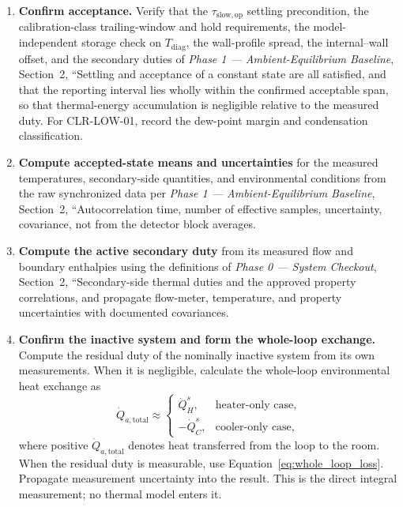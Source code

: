 \documentclass[11pt]{article}
\newcommand{\Tdiag}{T_{\mathrm{diag}}}
\newcommand{\QHs}{\dot Q_{H}^{s}}
\newcommand{\QCs}{\dot Q_{C}^{s}}
\newcommand{\PhaseZeroDoc}{\textit{Phase 0 --- System Checkout}}
\newcommand{\PhaseOneDoc}{\textit{Phase 1 --- Ambient-Equilibrium Baseline}}
\begin{document}
\begin{enumerate}
    \item \textbf{Confirm acceptance.} Verify that the $\tau_{\mathrm{slow,op}}$ settling precondition, the calibration-class trailing-window and hold requirements, the model-independent storage check on $\Tdiag$, the wall-profile spread, the internal--wall offset, and the secondary duties of \PhaseOneDoc, Section~2, ``Settling and acceptance of a constant state are all satisfied, and that the reporting interval lies wholly within the confirmed acceptable span, so that thermal-energy accumulation is negligible relative to the measured duty. For CLR-LOW-01, record the dew-point margin and condensation classification.

    \item \textbf{Compute accepted-state means and uncertainties} for the measured temperatures, secondary-side quantities, and environmental conditions from the raw synchronized data per \PhaseOneDoc, Section~2, ``Autocorrelation time, number of effective samples, uncertainty, covariance, not from the detector block averages.

    \item \textbf{Compute the active secondary duty} from its measured flow and boundary enthalpies using the definitions of \PhaseZeroDoc, Section~2, ``Secondary-side thermal duties and the approved property correlations, and propagate flow-meter, temperature, and property uncertainties with documented covariances.

    \item \textbf{Confirm the inactive system and form the whole-loop exchange.} Compute the residual duty of the nominally inactive system from its own measurements. When it is negligible, calculate the whole-loop environmental heat exchange as
    \begin{equation}
        \dot Q_{a,\mathrm{total}}
        \approx
        \begin{cases}
            \QHs,  & \text{heater-only case}, \\[4pt]
            -\QCs, & \text{cooler-only case},
        \end{cases}
    \end{equation}
    where positive $\dot Q_{a,\mathrm{total}}$ denotes heat transferred from the loop to the room. When the residual duty is measurable, use Equation~\eqref{eq:whole_loop_loss}. Propagate measurement uncertainty into the result. This is the direct integral measurement; no thermal model enters it.


\end{enumerate}
\end{document}
